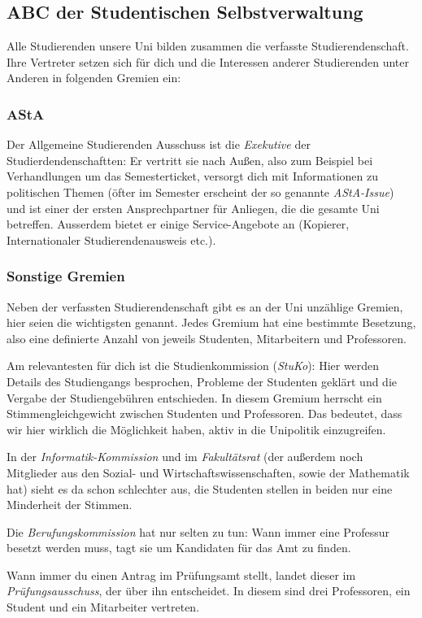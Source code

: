 	\subsection{ABC der Studentischen Selbstverwaltung}
	Alle Studierenden unsere Uni bilden zusammen die verfasste
	Studierendenschaft. Ihre Vertreter setzen sich für dich und die
	Interessen anderer Studierenden unter Anderen in folgenden
	Gremien ein:

	\subsubsection*{AStA}
		Der Allgemeine Studierenden Ausschuss ist die
		\emph{Exekutive} der Studierdendenschaftten: Er vertritt
		sie nach Außen, also zum Beispiel bei Verhandlungen um
		das Semesterticket, versorgt dich mit Informationen zu
		politischen Themen (öfter im Semester erscheint der so
		genannte \emph{AStA-Issue}) und ist einer der ersten
		Ansprechpartner für  Anliegen, die die gesamte Uni
		betreffen. Ausserdem bietet er einige Service-Angebote
		an (Kopierer, Internationaler Studierendenausweis etc.).

		\subsubsection*{Sonstige Gremien}
		Neben der verfassten Studierendenschaft gibt es an der Uni  unzählige Gremien, hier seien die wichtigsten genannt. Jedes Gremium hat eine bestimmte Besetzung, also eine definierte Anzahl von jeweils Studenten, Mitarbeitern und Professoren.

		Am relevantesten für dich ist die Studienkommission (\emph{StuKo}): Hier werden Details des Studiengangs besprochen, Probleme der Studenten geklärt und die Vergabe der Studiengebühren entschieden. In diesem Gremium herrscht ein Stimmengleichgewicht zwischen Studenten und Professoren. Das bedeutet, dass wir hier wirklich die Möglichkeit haben, aktiv in die Unipolitik einzugreifen.

		In der \emph{Informatik-Kommission} und im
		\emph{Fakultätsrat} (der außerdem noch Mitglieder aus
		den Sozial- und Wirtschaftswissenschaften, sowie der Mathematik hat) sieht es da schon schlechter aus, die Studenten stellen in beiden nur eine Minderheit der Stimmen.

		Die \emph{Berufungskommission} hat nur selten zu tun: Wann immer eine Professur besetzt werden muss, tagt sie um Kandidaten für das Amt zu finden.

		Wann immer du einen Antrag im Prüfungsamt stellt, landet
		dieser im \emph{Prüfungsausschuss}, der über ihn
		entscheidet. In diesem sind drei Professoren, ein Student und ein Mitarbeiter vertreten.

